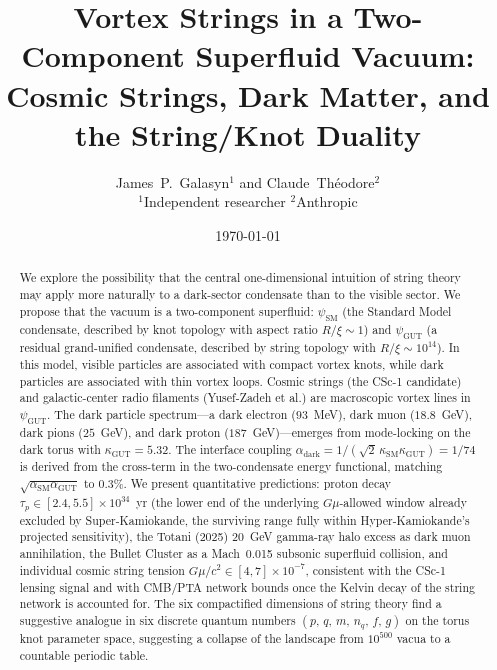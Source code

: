 \documentclass[11pt]{article}
\begin{document}
\title{Vortex Strings in a Two-Component Superfluid Vacuum:\\
Cosmic Strings, Dark Matter, and the String/Knot Duality}

\author{James~P.~Galasyn$^1$ and Claude~Th\'eodore$^2$\\
\small $^1$Independent researcher \quad $^2$Anthropic}

\date{\today}

\maketitle

\begin{abstract}
We explore the possibility that the central one-dimensional intuition of string theory may apply more naturally to a dark-sector condensate than to the visible sector.
We propose that the vacuum is a two-component superfluid: $\psi_\text{SM}$ (the Standard Model condensate, described by knot topology with aspect ratio $R/\xi \sim 1$) and $\psi_\text{GUT}$ (a residual grand-unified condensate, described by string topology with $R/\xi \sim 10^{14}$).
In this model, visible particles are associated with compact vortex knots, while dark particles are associated with thin vortex loops.
Cosmic strings (the CSc-1 candidate) and galactic-center radio filaments (Yusef-Zadeh et al.) are macroscopic vortex lines in $\psi_\text{GUT}$.
The dark particle spectrum---a dark electron ($93$~MeV), dark muon ($18.8$~GeV), dark pions ($25$~GeV), and dark proton ($187$~GeV)---emerges from mode-locking on the dark torus with $\kappa_\text{GUT} = 5.32$.
The interface coupling $\alpha_\text{dark} = 1/(\sqrt{2}\,\kappa_\text{SM}\kappa_\text{GUT}) = 1/74$ is derived from the cross-term in the two-condensate energy functional, matching $\sqrt{\alpha_\text{SM}\alpha_\text{GUT}}$ to $0.3\%$.
We present quantitative predictions: proton decay $\tau_p \in [2.4, 5.5] \times 10^{34}$~yr (the lower end of the underlying $G\mu$-allowed window already excluded by Super-Kamiokande, the surviving range fully within Hyper-Kamiokande's projected sensitivity), the Totani (2025) $20$~GeV gamma-ray halo excess as dark muon annihilation, the Bullet Cluster as a Mach~0.015 subsonic superfluid collision, and individual cosmic string tension $G\mu/c^2 \in [4, 7] \times 10^{-7}$, consistent with the CSc-1 lensing signal and with CMB/PTA network bounds once the Kelvin decay of the string network is accounted for.
The six compactified dimensions of string theory find a suggestive analogue in six discrete quantum numbers $(p,\,q,\,m,\,n_q,\,f,\,g)$ on the torus knot parameter space, suggesting a collapse of the landscape from $10^{500}$ vacua to a countable periodic table.
\end{abstract}
\end{document}
